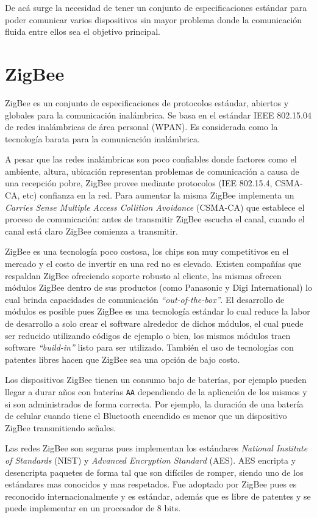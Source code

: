 \documentclass[10pt,journal,compsoc]{IEEEtran}
\begin{document}
De acá surge la necesidad de tener un conjunto de especificaciones estándar para poder comunicar varios dispositivos sin mayor problema donde la comunicación fluida entre ellos sea el objetivo principal. 


\section{ZigBee}
ZigBee es  un conjunto de especificaciones de protocolos estándar, abiertos y globales para la comunicación inalámbrica. Se basa en el estándar IEEE 802.15.04 de redes inalámbricas de área personal (WPAN). Es considerada como la tecnología barata para la comunicación inalámbrica.

A pesar que las redes inalámbricas son poco confiables donde factores como el ambiente, altura, ubicación representan problemas de comunicación a causa de una recepción pobre, ZigBee provee mediante protocolos (IEE 802.15.4, CSMA-CA, etc) confianza en la red. Para aumentar la misma ZigBee implementa un \emph{Carries Sense Multiple Access Collition Avoidance} (CSMA-CA) que establece el proceso de comunicación: antes de transmitir ZigBee escucha el canal, cuando el canal está claro ZigBee comienza a transmitir.

ZigBee es una tecnología poco costosa, los chips son muy competitivos en el mercado y el costo de invertir en una red no es elevado. Existen compañías \cite{gislason} que respaldan ZigBee ofreciendo soporte robusto al cliente, las mismas ofrecen módulos ZigBee dentro de sus productos (como Panasonic y Digi International) lo cual brinda capacidades de comunicación \emph{``out-of-the-box''}. El desarrollo de módulos es posible pues ZigBee es una tecnología estándar lo cual reduce la labor de desarrollo a solo crear el software alrededor de dichos módulos, el cual puede ser reducido utilizando códigos de ejemplo o bien, los mismos módulos traen software \emph{``build-in''} listo para ser utilizado. También el uso de tecnologías con patentes libres hacen que ZigBee sea una opción de bajo costo.

Los dispositivos ZigBee tienen un consumo bajo de baterías, por ejemplo pueden llegar a durar años con baterías \texttt{AA} dependiendo de la aplicación de los mismos y si son administrados de forma correcta. Por ejemplo, la duración de una batería de celular cuando tiene el Bluetooth encendido es menor que un dispositivo ZigBee transmitiendo señales. 

Las redes ZigBee son seguras pues implementan los estándares \emph{National Institute of Standards} (NIST) y \emph{Advanced Encryption Standard} (AES). AES encripta y desencripta paquetes de forma tal que son difíciles de romper, siendo uno de los estándares mas conocidos y mas respetados. Fue adoptado por ZigBee pues es reconocido internacionalmente y es estándar, además que es libre de patentes y se puede implementar en un procesador de 8 bits. 
\end{document}
